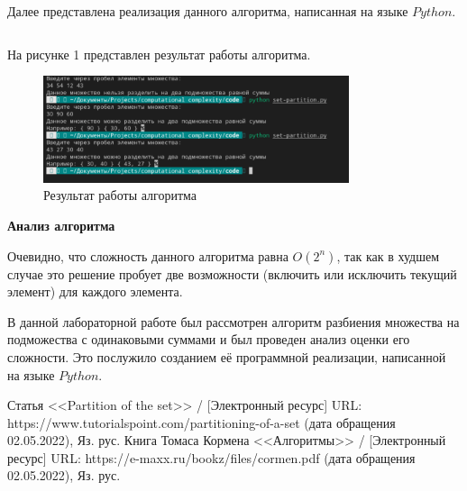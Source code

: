 \documentclass[bachelor, och, labwork]{shiza}
\begin{document}
  Далее представлена реализация данного алгоритма, написанная на языке $Python$.

  
  \inputminted[fontsize=\small]{Python}{code/set-partition.py}


  На рисунке 1 представлен результат работы алгоритма.

  \begin{figure}[H]
    \centering
    \includegraphics[width=0.8\textwidth]{img/5-1.png}
    \caption{Результат работы алгоритма}
  \end{figure}

  \textbf{Анализ алгоритма}

  Очевидно, что сложность данного алгоритма равна $O(2^n)$, так как в худшем случае это
  решение пробует две возможности (включить или исключить текущий элемент) для каждого элемента.

\conclusion

В данной лабораторной работе был рассмотрен алгоритм разбиения множества на подможества с одинаковыми суммами и был проведен анализ оценки его сложности.
Это послужило созданием её программной реализации, написанной на языке $Python$. 

\begin{thebibliography}{3}
  Статья <<Partition of the set>>  / [Электронный ресурс] URL: https://www.tutorialspoint.com/partitioning-of-a-set (дата обращения 02.05.2022), Яз. рус.
  Книга Томаса Кормена <<Алгоритмы>> / [Электронный ресурс] URL: https://e-maxx.ru/bookz/files/cormen.pdf (дата обращения 02.05.2022), Яз. рус.
\end{thebibliography}
\end{document}
